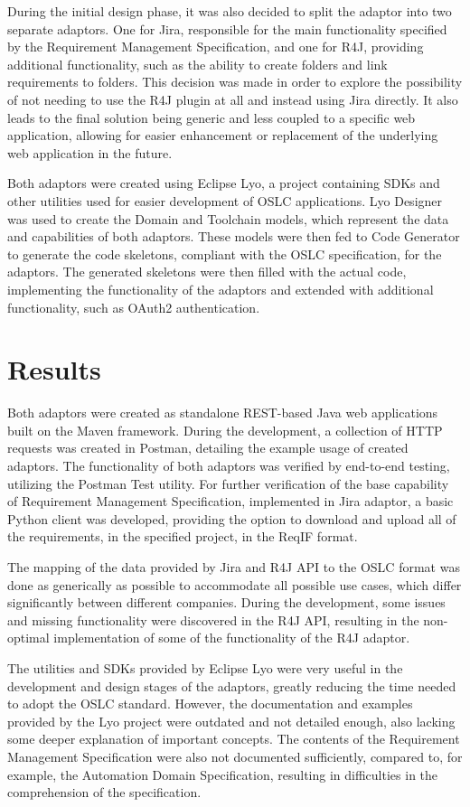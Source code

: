 During the initial design phase, it was also decided to split the adaptor into two separate adaptors. One for Jira, responsible for the main functionality specified by the Requirement Management Specification, and one for R4J, providing additional functionality, such as the ability to create folders and link requirements to folders. This decision was made in order to explore the possibility of not needing to use the R4J plugin at all and instead using Jira directly. It also leads to the final solution being generic and less coupled to a specific web application, allowing for easier enhancement or replacement of the underlying web application in the future.

Both adaptors were created using Eclipse Lyo, a project containing SDKs and other utilities used for easier development of OSLC applications. Lyo Designer was used to create the Domain and Toolchain models, which represent the data and capabilities of both adaptors. These models were then fed to Code Generator to generate the code skeletons, compliant with the OSLC specification, for the adaptors. The generated skeletons were then filled with the actual code, implementing the functionality of the adaptors and extended with additional functionality, such as OAuth2 authentication.

\section{Results}
Both adaptors were created as standalone REST-based Java web applications built on the Maven framework. During the development, a collection of HTTP requests was created in Postman, detailing the example usage of created adaptors. The functionality of both adaptors was verified by end-to-end testing, utilizing the Postman Test utility. For further verification of the base capability of Requirement Management Specification, implemented in Jira adaptor, a basic Python client was developed, providing the option to download and upload all of the requirements, in the specified project, in the ReqIF format.

The mapping of the data provided by Jira and R4J API to the OSLC format was done as generically as possible to accommodate all possible use cases, which differ significantly between different companies. During the development, some issues and missing functionality were discovered in the R4J API, resulting in the non-optimal implementation of some of the functionality of the R4J adaptor.

The utilities and SDKs provided by Eclipse Lyo were very useful in the development and design stages of the adaptors, greatly reducing the time needed to adopt the OSLC standard. However, the documentation and examples provided by the Lyo project were outdated and not detailed enough, also lacking some deeper explanation of important concepts. The contents of the Requirement Management Specification were also not documented sufficiently, compared to, for example, the Automation Domain Specification, resulting in difficulties in the comprehension of the specification.

